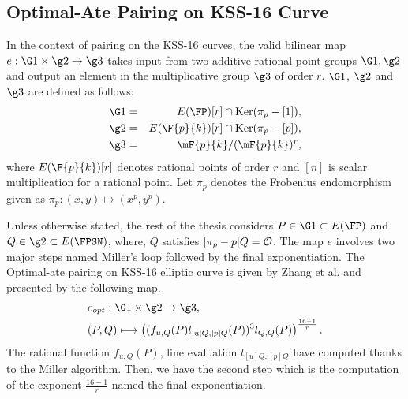 \subsection{Optimal-Ate Pairing on KSS-16 Curve}
In the context of pairing on the KSS-16 curves, the valid bilinear map $e:\G1 \times \g2 \rightarrow \g3$ takes input from two additive rational point groups $\G1, \g2$ 
and output an element in the multiplicative group $\g3$ of order $r$. 
$\G1$, $\g2$ and $\g3$ are defined as follows:
\begin{eqnarray}\label{eq:g1}
\G1 & = &  E(\FP) [r] \cap \text{Ker}(\pi_p - [1]), \nonumber \\
\g2 & = &  E(\F{p}{k}) [r] \cap \text{Ker}(\pi_p - [p]), \nonumber \\
\g3 & = & \mF{p}{k}/(\mF{p}{k})^r, \nonumber
\end{eqnarray}
where $E(\F{p}{k})[r]$ denotes rational points of order $r$ and $[n]$ is scalar multiplication for a rational point. 
Let $\pi_p$ denotes the Frobenius endomorphism given as $\pi_p: (x,y) \mapsto (x^p,y^p)$.

Unless otherwise stated, the rest of the thesis considers $P \in \G1 \subset E(\FP)$ and  $Q \in \g2 \subset  E(\FPSN)$, where, $Q$ satisfies $[\pi_p -p]Q = \cal O$.
The map $e$ involves two major steps named Miller's loop followed by the final exponentiation.
The Optimal-ate pairing \cite{DBLP:journals/tit/Vercauteren10} on KSS-16 elliptic curve is given by Zhang et al. \cite{INDOCRYPT:ZhaLin12} and presented by the following map.
\begin{align}
 & e_{opt}: \G1\times \g2 \rightarrow  \g3, \\
&  (P,Q) \longmapsto \left(( f_{u,Q}(P)l_{[u]Q,[p]Q}(P))^{3}l_{Q,Q}(P)\right)^{\frac{{16}-1}{r}}.
\end{align}
The rational function $f_{u,Q}(P)$, line evaluation $l_{[u]Q,[p]Q}$ have computed thanks to the Miller algorithm. 
Then, we have the second step which is the computation of the exponent $\frac{{16}-1}{r}$ named the final exponentiation.

